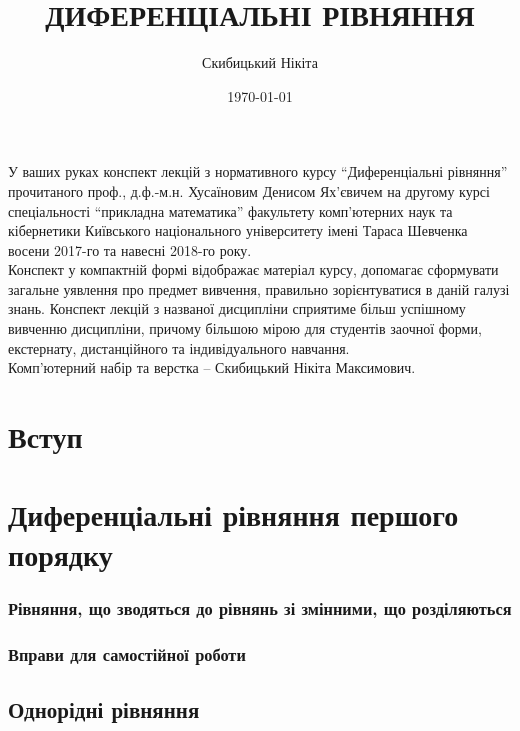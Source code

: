 \documentclass[a4paper, 12pt]{article}
\title{{\Huge ДИФЕРЕНЦІАЛЬНІ РІВНЯННЯ}}
\author{Скибицький Нікіта}
\date{\today}
\theoremstyle{definition}
\numberwithin{equation}{section}%
\numberwithin{equation}{subsection}
\begin{document}
\maketitle \thispagestyle{empty} \newpage 

У ваших руках конспект лекцій з нормативного курсу ``Диференціальні рівняння'' прочитаного проф., д.ф.-м.н. Хусаїновим Денисом Ях'євичем на другому курсі спеціальності ``прикладна математика'' факультету ком\-п'ю\-тер\-них наук та кібернетики Київського національного університету імені Тараса Шевченка восени 2017-го та навесні 2018-го року. \\

Конспект у компактній формі відображає матеріал курсу, допомагає сформувати загальне уявлення про предмет вивчення, правильно зорієнтуватися в даній галузі знань. Конспект лекцій з названої дисципліни сприятиме більш успішному вивченню дисципліни, причому більшою мірою для студентів заочної форми, екстернату, дистанційного та індивідуального навчання. \\

Комп'ютерний набір та верстка -- Скибицький Нікіта Максимович. \newpage

\tableofcontents \newpage

\section*{Вступ}



\section{Диференціальні рівняння першого порядку}



\subsubsection{Рівняння, що зводяться до рівнянь зі змінними, що розділяються}



\subsubsection{Вправи для самостійної роботи}



\subsection{Однорідні рівняння}
\end{document}
